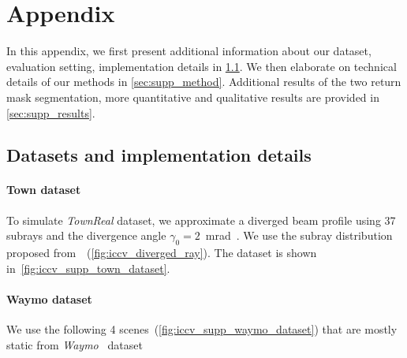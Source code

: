 \section{Appendix}
In this appendix, we first present additional information about our dataset, evaluation setting, implementation details in \cref{sec:supp_data}. We then elaborate on technical details of our methods in \cref{sec:supp_method}. Additional results of the two return mask segmentation, more quantitative and qualitative results are provided in \cref{sec:supp_results}.

\subsection{Datasets and implementation details}
\label{sec:supp_data}
\paragraph{Town dataset}
To simulate \textit{TownReal} dataset, we approximate a diverged beam profile using 37 subrays and the divergence angle $\gamma_0 = 2 $~mrad~\cite{glennie2012calibration}. We use the subray distribution proposed from~\cite{winiwarter2022virtual}~(\cf \cref{fig:iccv_diverged_ray}). The dataset is shown in~\cref{fig:iccv_supp_town_dataset}. 

\paragraph{Waymo dataset}
We use the following 4 scenes~(\cf \cref{fig:iccv_supp_waymo_dataset}) that are mostly static from \textit{Waymo}~\cite{sun2020scalability} dataset 


\begin{table}[!h]
    \setlength{\tabcolsep}{6pt}
    \renewcommand{\arraystretch}{1.2}
	\centering
\end{table}

